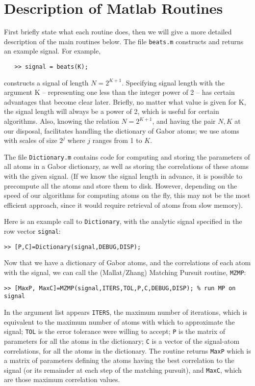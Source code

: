 \section{Description of Matlab Routines}
First briefly state what each routine does, then we will give a more
detailed description of the main routines below.
The file {\tt beats.m} constructs and returns an example signal.
For example, 
\begin{verbatim}
   >> signal = beats(K); 
\end{verbatim}
constructs a signal of length $N = 2^{K+1}$.  Specifying signal
length with the argument K -- representing one less than the integer
power of 2 -- has certain advantages that become clear
later. Briefly, no matter what value is given for K, the signal
length will always be a power of 2, which is useful for certain
algorithms. Also, knowing the relation $N=2^{K+1}$, and having the
pair $N,K$ at our disposal, facilitates handling the dictionary of 
Gabor atoms; we use atoms with scales of size $2^j$ where $j$ ranges
from 1 to $K$. 

The file {\tt Dictionary.m} contains code for computing and storing
the parameters of all atoms in a Gabor dictionary, as well as
storing the correlations of these atoms with the given signal. (If
we know the signal length in advance, it is possible to precompute
all the atoms and store them to disk.  However, depending on the speed
of our algorithms for computing atoms on the fly, this may not be
the most efficient approach, since it would require retrieval of atoms
from slow memory). 

Here is an example call to {\tt Dictionary}, with the analytic signal
specified in the row vector {\tt signal}:
\begin{verbatim}
>> [P,C]=Dictionary(signal,DEBUG,DISP);
\end{verbatim}

Now that we have a dictionary of Gabor atoms, and the correlations
of each atom with the signal, we can call the (Mallat/Zhang)
Matching Pursuit routine, {\tt MZMP}:
\begin{verbatim}
>> [MaxP, MaxC]=MZMP(signal,ITERS,TOL,P,C,DEBUG,DISP); % run MP on signal
\end{verbatim}
In the argument list appears {\tt ITERS}, the maximum number of
iterations, which is equivalent to the maximum number of atoms with
which to approximate the signal; {\tt TOL} is the error tolerance were
willing to accept; {\tt P} is the matrix of parameters for all the atoms
in the dictionary; {\tt C} is a vector of the signal-atom correlations,
for all the atoms in the dictionary.  The routine returns {\tt MaxP}
which is a matrix of parameters defining the atoms having the best
correlation to the signal (or its remainder at each step of the matching
pursuit), and {\tt MaxC}, which are those maximum correlation values.

